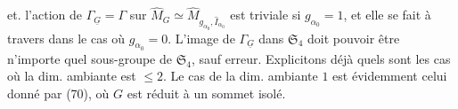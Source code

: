  et. l'action de $\Gamma_{\underline G}=\Gamma$ sur $\widehat M_G\simeq\widehat M_{g_{\alpha_0},\widehat I_{\alpha_0}}$ est triviale si $g_{\alpha_0}=1$, et elle se fait à travers
dans le cas où $g_{\alpha_0}=0$. L'image de $\Gamma_{\underline G}$ dans $\mathfrak S_4$ doit pouvoir être n'importe quel sous-groupe de $\mathfrak S_4$, sauf erreur. Explicitons déjà quels sont les cas où la dim. ambiante est $\leq2$. Le cas de la dim. ambiante $1$  est évidemment celui donné par (70), où $G$ est réduit à un sommet isolé.

